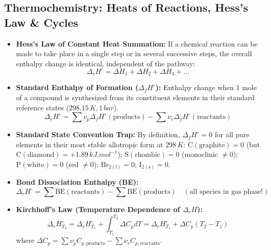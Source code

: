 \documentclass[10pt,a4paper]{article}
\begin{document}
\subsection{Thermochemistry: Heats of Reactions, Hess's Law \& Cycles}
\begin{conceptbox}
\begin{itemize}
  \item \textbf{Hess's Law of Constant Heat Summation:} If a chemical reaction can be made to take place in a single step or in several successive steps, the overall enthalpy change is identical, independent of the pathway:
  \begin{equation}
    \Delta_r H^\circ = \Delta H_1 + \Delta H_2 + \Delta H_3 + \dots
  \end{equation}
  \item \textbf{Standard Enthalpy of Formation ($\Delta_f H^\circ$):} Enthalpy change when 1 mole of a compound is synthesized from its constituent elements in their standard reference states ($298.15\,\si{K}, 1\,\si{bar}$).
  \begin{equation}
    \Delta_r H^\circ = \sum \nu_p \Delta_f H^\circ(\text{products}) - \sum \nu_r \Delta_f H^\circ(\text{reactants})
  \end{equation}
  \item \textbf{Standard State Convention Trap:} By definition, $\Delta_f H^\circ = 0$ for all pure elements in their most stable allotropic form at $298\,\si{K}$: $\mathrm{C(\text{graphite})} = 0$ (but $\mathrm{C(\text{diamond})} = +1.89\,\si{kJ.mol^{-1}}$); $\mathrm{S(\text{rhombic})} = 0$ (monoclinic $\ne 0$); $\mathrm{P(\text{white})} = 0$ (red $\ne 0$); $\mathrm{Br_{2(l)}} = 0$; $\mathrm{I_{2(s)}} = 0$.
  \item \textbf{Bond Dissociation Enthalpy (BE):}
  \begin{equation}
    \Delta_r H^\circ = \sum \text{BE}(\text{reactants}) - \sum \text{BE}(\text{products}) \quad (\text{all species in gas phase!})
  \end{equation}
  \item \textbf{Kirchhoff's Law (Temperature Dependence of $\Delta_r H$):}
  \begin{equation}
    \Delta_r H_{T_2}^\circ = \Delta_r H_{T_1}^\circ + \int_{T_1}^{T_2} \Delta C_p dT = \Delta_r H_{T_1}^\circ + \Delta C_p (T_2 - T_1)
  \end{equation}
  where $\Delta C_p = \sum \nu_p C_{p,\text{products}} - \sum \nu_r C_{p,\text{reactants}}$.
\end{itemize}
\end{conceptbox}
\end{document}
